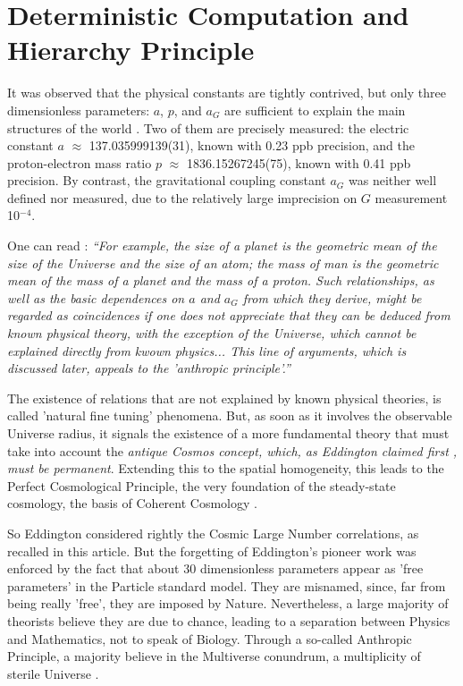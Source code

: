 \documentclass[twoside,draft]{article}
\begin{document}
\begin{sloppypar}
{\section{Deterministic Computation and Hierarchy Principle}
It was observed that the physical constants are tightly contrived, but only three dimensionless parameters: $a$, $p$, and $a_{G}$ are sufficient to explain the main structures of the world \cite{Carr}. Two of them are precisely measured: the electric constant $a$ $\approx$ 137.035999139(31), known with 0.23 ppb precision, and the proton-electron mass ratio $p$ $\approx$ 1836.15267245(75), known with 0.41 ppb precision. By contrast, the gravitational coupling constant $a_{G}$ was neither well defined nor measured, due to the relatively large imprecision on $G$ measurement 10$^{-4}\!$.

One can read \cite{Carr}: \textit{“For example, the size of a planet is the geometric mean of the size of the Universe and the size of an atom; the mass of man is the geometric mean of the mass of a planet and the mass of a proton. Such relationships, as well as the basic dependences on $a$ and $a_G$ from which they derive, might be regarded as coincidences if one does not appreciate that they can be deduced from known physical theory, with the exception of the Universe, which cannot be explained directly from kwown physics... This line of arguments, which is discussed later, appeals to the 'anthropic principle'.”}

The existence of relations that are not explained by known physical theories, is called 'natural fine tuning' phenomena. But, as soon as it involves the observable Universe radius, it signals the existence of a more fundamental theory that must take into account the \textit{antique Cosmos concept, which, as Eddington claimed first \cite{Eddy}, must be permanent}. Extending this to the spatial homogeneity, this leads to the Perfect Cosmological Principle, the very foundation of the steady-state cosmology, the basis of Coherent Cosmology \cite{Sanchez1}.

So Eddington considered rightly the Cosmic Large Number correlations, as recalled in this article. But the forgetting of Eddington's pioneer work was enforced by the fact that about 30 dimensionless parameters appear as 'free parameters' in the Particle standard model. They are misnamed, since, far from being really 'free', they are imposed by Nature. Nevertheless, a large majority of theorists believe they are due to chance, leading to a separation between Physics and Mathematics, not to speak of Biology. Through a so-called Anthropic Principle, a majority believe in the Multiverse conundrum, a multiplicity of sterile Universe \cite{Carr}.

}
\end{sloppypar}
\end{document}
